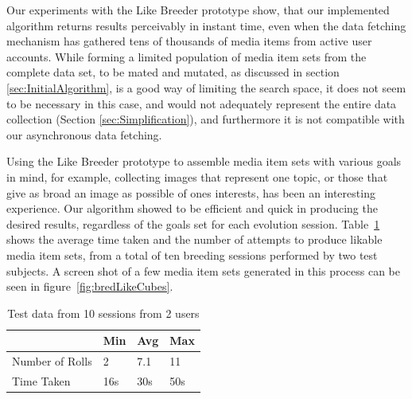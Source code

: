 \documentclass[conference]{IEEETran}
\begin{document}
Our experiments with the Like Breeder prototype show, that our implemented algorithm returns results perceivably in instant time, even when the data fetching mechanism has gathered tens of thousands of media items from active user accounts.  While forming a limited population of media item sets from the complete data set, to be mated and mutated, as discussed in section \ref{sec:InitialAlgorithm}, is a good way of limiting the search space, it does not seem to be necessary in this case, and would not adequately represent the entire data collection (Section \ref{sec:Simplification}), and furthermore it is not compatible with our asynchronous data fetching.

Using the Like Breeder prototype to assemble media item sets with various goals in mind, for example, collecting images that represent one topic, or those that give as broad an image as possible of ones interests, has been an interesting experience.  Our algorithm showed to be efficient and quick in producing the desired results, regardless of the goals set for each evolution session.  Table~\ref{fig:testRunData} shows the average time taken and the number of attempts to produce likable media item sets, from a total of ten breeding sessions performed by two test subjects.  A screen shot of a few media item sets generated in this process can be seen in figure~\ref{fig:bredLikeCubes}.

\begin{table}[htp]
\begin{tabular}{|p{2.45cm}|p{.8cm}|p{.8cm}|p{.8cm}|}
\hline
 & Min & Avg & Max \\
\hline
Number of Rolls & 2 & 7.1 & 11 \\
\hline
Time Taken & 16s & 30s & 50s \\
\hline
\end{tabular}
\caption{Test data from 10 sessions from 2 users} 
\label{fig:testRunData}
\end{table}
\end{document}
